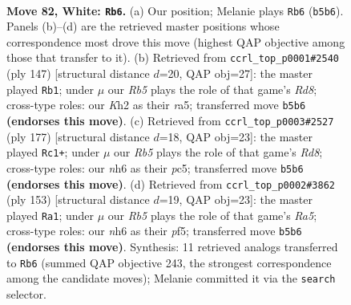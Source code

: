 \documentclass[11pt]{article}
\begin{document}
\clearpage

\begin{figure}[p]\centering
\begin{subfigure}{0.46\textwidth}\centering
\resizebox{\linewidth}{!}{%
\newchessgame
\chessboard[
  setfen={2k5/8/7n/1R6/p6r/P6p/7K/8 w - - 22 82},
  showmover=false,
  pgfstyle=straightmove, color=movearrow, markmove={b5-b6}
]}
\caption{}
\end{subfigure}\hfill
\begin{subfigure}{0.46\textwidth}\centering
\resizebox{\linewidth}{!}{%
\newchessgame
\chessboard[
  setfen={8/8/7k/R6P/p7/4K3/1P6/3r4 b - - 3 74},
  showmover=false,
  pgfstyle=straightmove, color=movearrow, markmove={d1-b1}
]}
\caption{}
\end{subfigure}
\\[4pt]
\begin{subfigure}{0.46\textwidth}\centering
\resizebox{\linewidth}{!}{%
\newchessgame
\chessboard[
  setfen={8/k7/P7/R1P5/2K5/8/8/3r4 b - - 18 89},
  showmover=false,
  pgfstyle=straightmove, color=movearrow, markmove={d1-c1}
]}
\caption{}
\end{subfigure}\hfill
\begin{subfigure}{0.46\textwidth}\centering
\resizebox{\linewidth}{!}{%
\newchessgame
\chessboard[
  setfen={8/7k/7P/4KP1R/r7/8/8/8 b - - 16 77},
  showmover=false,
  pgfstyle=straightmove, color=movearrow, markmove={a4-a1}
]}
\caption{}
\end{subfigure}
\caption{\textbf{Move 82, White: \texttt{Rb6}.} (a) Our position; Melanie plays \texttt{Rb6} (\texttt{b5b6}). Panels (b)--(d) are the retrieved master positions whose correspondence most drove this move (highest QAP objective among those that transfer to it). (b) Retrieved from \texttt{ccrl\_top\_p0001\#2540} (ply 147) [structural distance $d$=20, QAP obj=27]: the master played \texttt{Rb1}; under $\mu$ our \emph{Rb5} plays the role of that game's \emph{Rd8}; cross-type roles: our \emph{K}h2 as their \emph{r}a5; transferred move \texttt{b5b6} \textbf{(endorses this move)}. (c) Retrieved from \texttt{ccrl\_top\_p0003\#2527} (ply 177) [structural distance $d$=18, QAP obj=23]: the master played \texttt{Rc1+}; under $\mu$ our \emph{Rb5} plays the role of that game's \emph{Rd8}; cross-type roles: our \emph{n}h6 as their \emph{p}c5; transferred move \texttt{b5b6} \textbf{(endorses this move)}. (d) Retrieved from \texttt{ccrl\_top\_p0002\#3862} (ply 153) [structural distance $d$=19, QAP obj=23]: the master played \texttt{Ra1}; under $\mu$ our \emph{Rb5} plays the role of that game's \emph{Ra5}; cross-type roles: our \emph{n}h6 as their \emph{p}f5; transferred move \texttt{b5b6} \textbf{(endorses this move)}. Synthesis: 11 retrieved analogs transferred to \texttt{Rb6} (summed QAP objective 243, the strongest correspondence among the candidate moves); Melanie committed it via the \texttt{search} selector.}
\label{fig:thought-m162}
\end{figure}
\end{document}
